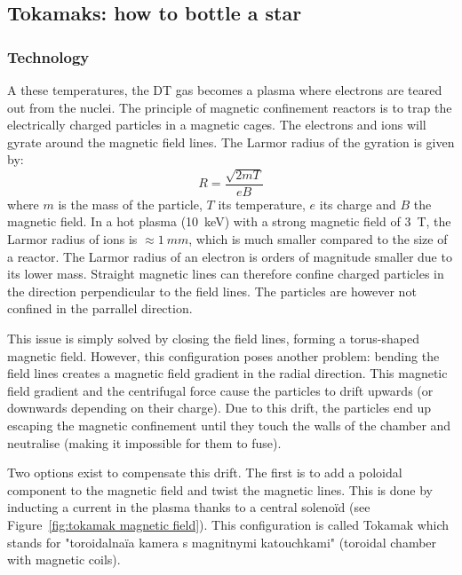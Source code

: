 \subsection{Tokamaks: how to bottle a star}

\subsubsection{Technology}
A these temperatures, the DT gas becomes a plasma where electrons are teared out from the nuclei.
The principle of magnetic confinement reactors is to trap the electrically charged particles in a magnetic cages.
The electrons and ions will gyrate around the magnetic field lines.
The Larmor radius of the gyration is given by:
\begin{equation}
    R =  \frac{\sqrt{2 m T}}{e B}
\end{equation}
where $m$ is the mass of the particle, $T$ its temperature, $e$ its charge and $B$ the magnetic field.
In a hot plasma (\SI{10}{keV}) with a strong magnetic field of \SI{3}{T}, the Larmor radius of ions is $\approx \SI{1}{mm}$, which is much smaller compared to the size of a reactor.
The Larmor radius of an electron is orders of magnitude smaller due to its lower mass.
Straight magnetic lines can therefore confine charged particles in the direction perpendicular to the field lines.
The particles are however not confined in the parrallel direction.

This issue is simply solved by closing the field lines, forming a torus-shaped magnetic field.
However, this configuration poses another problem: bending the field lines creates a magnetic field gradient in the radial direction.
This magnetic field gradient and the centrifugal force cause the particles to drift upwards (or downwards depending on their charge).
Due to this drift, the particles end up escaping the magnetic confinement until they touch the walls of the chamber and neutralise (making it impossible for them to fuse).

Two options exist to compensate this drift.
The first is to add a poloidal component to the magnetic field and twist the magnetic lines.
This is done by inducting a current in the plasma thanks to a central solenoïd (see Figure~\ref{fig:tokamak magnetic field}).
This configuration is called Tokamak which stands for "toroidalnaïa kamera s magnitnymi katouchkami" (toroidal chamber with magnetic coils).

